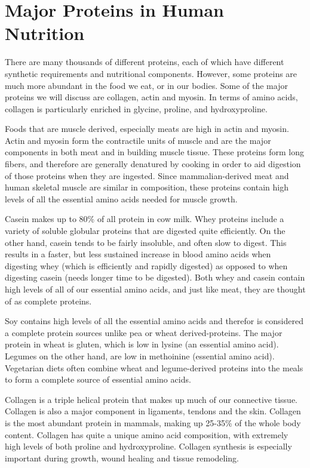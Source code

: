 \documentclass{tufte-handout}
\begin{document}
\section{Major Proteins in Human Nutrition}
There are many thousands of different proteins, each of which have different synthetic requirements and nutritional components.  However, some proteins are much more abundant in the food we eat, or in our bodies.  Some of the major proteins we will discuss are collagen, actin and myosin.  In terms of amino acids, collagen is particularly enriched in glycine, proline, and hydroxyproline.

  Foods that are muscle derived, especially meats are high in actin and myosin.  Actin and myosin form the contractile units of muscle and are the major components in both meat and in building muscle tissue.  These proteins form long fibers, and therefore are generally denatured by cooking in order to aid digestion of those proteins when they are ingested.  Since mammalian-derived meat and human skeletal muscle are similar in composition, these proteins contain high levels of all the essential amino acids needed for muscle growth.

  Casein makes up to 80\% of all protein in cow milk.  Whey proteins include a variety of soluble globular proteins that are digested quite efficiently.  On the other hand, casein tends to be fairly insoluble, and often slow to digest.  This results in a faster, but less sustained increase in blood amino acids when digesting whey (which is efficiently and rapidly digested) as opposed to when digesting casein (needs longer time to be digested).  Both whey and casein contain high levels of all of our essential amino acids, and just like meat, they are thought of as complete proteins.

  Soy contains high levels of all the essential amino acids and therefor is considered a complete protein sources unlike pea or wheat derived-proteins.  The major protein in wheat is gluten, which is low in lysine (an essential amino acid).  Legumes on the other hand, are low in methoinine (essential amino acid).  Vegetarian diets often combine wheat and legume-derived proteins into the meals to form a complete source of essential amino acids.

Collagen is a triple helical protein that makes up much of our connective tissue.  Collagen is also a major component in ligaments, tendons and the skin.  Collagen is the most abundant protein in mammals, making up 25-35\% of the whole body content.  Collagen has quite a unique amino acid composition, with extremely high levels of both proline and hydroxyproline.  Collagen synthesis is especially important during growth, wound healing and tissue remodeling.
\end{document}
